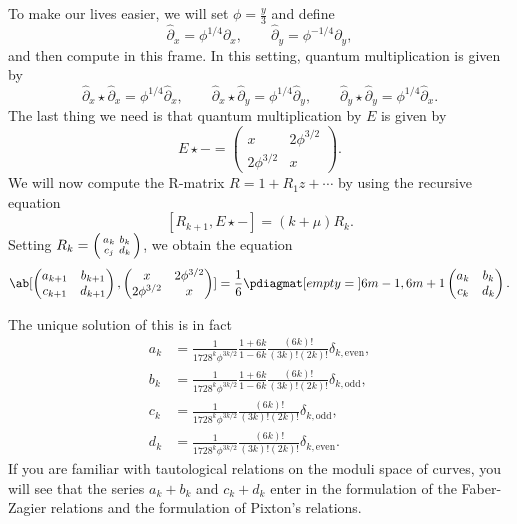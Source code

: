 \documentclass{amsart}
\theoremstyle{definition}
\theoremstyle{remark}
\theoremstyle{plain}
\theoremstyle{definition}
\theoremstyle{remark}
\newcommand{\1}{\mathbf{1}}
\newcommand{\2}{\mathbf{2}}
\newcommand{\3}{\mathbf{3}}
\begin{document}
To make our lives easier, we will set \(\phi = \frac{y}{3}\) and define
\[ \hat{\partial}_x = \phi^{1/4} \partial_x, \qquad \hat{\partial}_y = \phi^{-1/4} \partial_y, \]
and then compute in this frame. In this setting, quantum multiplication is given by
\[ \hat{\partial}_x \star \hat{\partial}_x = \phi^{1/4} \hat{\partial}_x, \qquad \hat{\partial}_x \star \hat{\partial}_y = \phi^{1/4} \hat{\partial}_y, \qquad \hat{\partial}_y \star \hat{\partial}_y = \phi^{1/4} \hat{\partial}_x. \]
The last thing we need is that quantum multiplication by \(E\) is given by
\[ E \star - = \begin{pmatrix}
    x & 2 \phi^{3/2} \\
    2 \phi^{3/2} & x 
\end{pmatrix}. \]
We will now compute the R-matrix \(R = 1 + R_1 z + \cdots\) by using the recursive equation
\[ [R_{k+1}, E \star -] = (k + \mu) R_k. \]
Setting \(R_k = \begin{psmallmatrix}
    a_k & b_k \\
    c_j & d_k
\end{psmallmatrix}\), we obtain the equation
\[ \ab[
    \begin{pmatrix}
        a_{k+1} & b_{k+1} \\
        c_{k+1} & d_{k+1}
    \end{pmatrix}, \begin{pmatrix}
        x & 2 \phi^{3/2} \\
        2 \phi^{3/2} & x 
    \end{pmatrix}
] = \frac{1}{6} \pdiagmat[empty={}]{6m-1, 6m+1} \begin{pmatrix}
    a_k & b_k \\
    c_k & d_k 
\end{pmatrix}. \]

The unique solution of this is in fact
\begin{align*}
    a_k &= \frac{1}{1728^k \phi^{3k/2}} \frac{1+6k}{1-6k} \frac{(6k)!}{(3k)!(2k)!} \delta_{k, \text{even}},  \\
    b_k &= \frac{1}{1728^k \phi^{3k/2}} \frac{1+6k}{1-6k}\frac{(6k)!}{(3k)!(2k)!} \delta_{k, \text{odd}},  \\
    c_k &= \frac{1}{1728^k \phi^{3k/2}}\frac{(6k)!}{(3k)!(2k)!} \delta_{k, \text{odd}}, \\
    d_k &= \frac{1}{1728^k \phi^{3k/2}} \frac{(6k)!}{(3k)!(2k)!} \delta_{k, \text{even}}. 
\end{align*}
If you are familiar with tautological relations on the moduli space of curves, you will see that the series \(a_k + b_k\) and \(c_k + d_k\) enter in the formulation of the Faber-Zagier relations and the formulation of Pixton's relations. 
\end{document}
